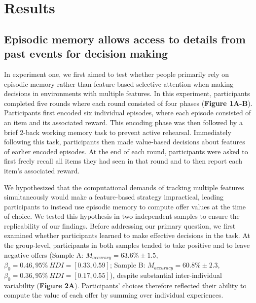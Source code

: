 \documentclass[10pt,letterpaper]{article}
\begin{document}
\section{Results}

\subsection{Episodic memory allows access to details from past events for decision making}

In experiment one, we first aimed to test whether people primarily rely on episodic memory rather than feature-based selective attention when making decisions in environments with multiple features. In this experiment, participants completed five rounds where each round consisted of four phases (\textbf{Figure 1A-B}). Participants first encoded six individual episodes, where each episode consisted of an item and its associated reward. This encoding phase was then followed by a brief 2-back working memory task to prevent active rehearsal. Immediately following this task, participants then made value-based decisions about features of earlier encoded episodes. At the end of each round, participants were asked to first freely recall all items they had seen in that round and to then report each item's associated reward.

We hypothesized that the computational demands of tracking multiple features simultaneously would make a feature-based strategy impractical, leading participants to instead use episodic memory to compute offer values at the time of choice. We tested this hypothesis in two independent samples to ensure the replicability of our findings. Before addressing our primary question, we first examined whether participants learned to make effective decisions in the task. At the group-level, participants in both samples tended to take positive and to leave negative offers (Sample A: $M_{accuracy} = 63.6\% \pm 1.5$, $\beta_{0} = 0.46, 95\% \ HDI = [0.33, 0.59]$; Sample B: $M_{accuracy} = 60.8\% \pm 2.3$, $\beta_{0} = 0.36, 95\% \ HDI = [0.17, 0.55]$), despite substantial inter-individual variability (\textbf{Figure 2A}). Participants' choices therefore reflected their ability to compute the value of each offer by summing over individual experiences.
\end{document}

